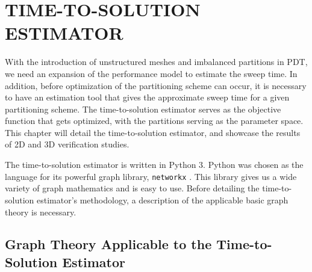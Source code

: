 %
%
%
%
 \setcounter{MaxMatrixCols}{30}
\newcommand{\tcr}[1]{\textcolor{red}{#1}}


\chapter{TIME-TO-SOLUTION ESTIMATOR \label{cha:tts}}
With the introduction of unstructured meshes and imbalanced partitions in PDT, we need an expansion of the performance model to estimate the sweep time.
In addition, before optimization of the partitioning scheme can occur, it is necessary to have an estimation tool that gives the approximate sweep time for a given partitioning scheme.
The time-to-solution estimator serves as the objective function that gets optimized, with the partitions serving as the parameter space. This chapter will detail the time-to-solution estimator, and showcase the results of 2D and 3D verification studies.

The time-to-solution estimator is written in Python 3. Python was chosen as the language for its powerful graph library, {\tt networkx} \cite{networkx}.
This library gives us a wide variety of graph mathematics and is easy to use.
Before detailing the time-to-solution estimator's methodology, a description of the applicable basic graph theory is necessary.

\section{Graph Theory Applicable to the Time-to-Solution Estimator}


